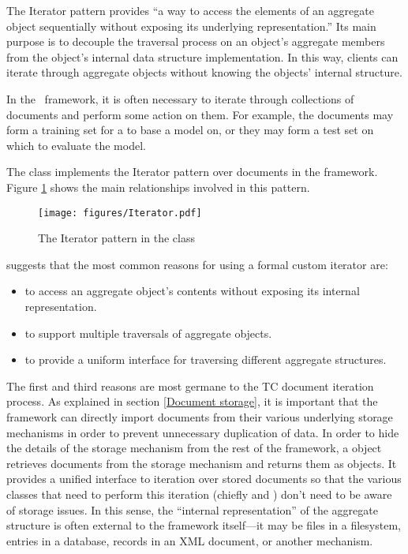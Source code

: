 The Iterator pattern provides ``a way to access the elements of an
aggregate object sequentially without exposing its underlying
representation.'' \cite[p. 257]{gamma:95} Its main purpose is to
decouple the traversal process on an object's aggregate members from
the object's internal data structure implementation.  In this way,
clients can iterate through aggregate objects without knowing the
objects' internal structure.

In the \aicat\ framework, it is often necessary to iterate
through collections of documents and perform some action on them.  For
example, the documents may form a training set for a  to base a
model on, or they may form a test set on which to evaluate the model.

The  class implements the Iterator pattern
\cite[p. 257]{gamma:95} over documents in the framework.  Figure
\ref{Iterator-collection} shows the main relationships involved in
this pattern.

\begin{figure}
\texttt{[image: figures/Iterator.pdf]}
\caption{The Iterator pattern in the  class}
\label{Iterator-collection}
\end{figure}


\cite[p. 259]{gamma:95} suggests that the most common reasons for
using a formal custom iterator are:

\begin{itemize}

\item to access an aggregate object's contents without exposing its
internal representation.

\item to support multiple traversals of aggregate objects.

\item to provide a uniform interface for traversing different
aggregate structures.

\end{itemize}

The first and third reasons are most germane to the TC document iteration
process.  As explained in section \ref{Document storage}, it is
important that the framework can directly import documents from their
various underlying storage mechanisms in order to prevent unnecessary
duplication of data.  In order to hide the details of the storage
mechanism from the rest of the framework, a  object
retrieves documents from the storage mechanism and returns them
as  objects.  It provides a unified interface to iteration
over stored documents so that the various classes that need to perform
this iteration (chiefly  and ) don't need to be
aware of storage issues.  In this sense, the ``internal
representation'' of the aggregate structure is often external to the
framework itself---it may be files in a filesystem, entries in a
database, records in an XML document, or another mechanism.

